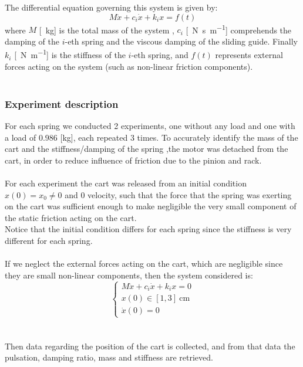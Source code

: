 The differential equation governing this system is given by:
$$M\ddot{x}+c_i\dot{x}+k_i x = f(t)$$
where $M$ [\SI{}{\kilo \gram}] is the total mass of the system  , $c_i$ [\SI{}{\newton \second \per \meter }] comprehends the damping of the $i$-eth spring and the viscous damping of the sliding guide. Finally $k_i$ [\SI{}{\newton \per \meter}] is the stiffness of the $i$-eth spring, and $f(t)$ represents external forces acting on the system (such as non-linear friction components). 
\\ \\
\subsubsection{Experiment description}
For each spring we conducted 2 experiments, one without any load and one with a load of $0.986$ [\si{\kg}], each repeated 3 times. To accurately identify the mass of the cart and the stiffness/damping of the spring ,the motor was detached from the cart, in order to reduce influence of friction due to the pinion and rack. \\\\
For each experiment the  cart was released from an initial condition $x(0) =x_0 \neq 0$ and $0$ velocity,  such that the force that the spring was exerting on the cart was sufficient enough to  make negligible the very small component of the static friction acting on the cart. \\ Notice that the initial condition differs for each spring since the stiffness is very different for each spring. \\\\
If we neglect the external forces acting on the cart, which are negligible since they are small non-linear components, then the system considered is:
\begin{equation} \label{eq:cart_detached_motor}
\begin{cases}
M\ddot{x}+c_i\dot{x}+k_i x = 0 \\
x(0) \in [1,3] \SI{}{\cm} \\
\dot{x}(0)=0
\end{cases}
\end{equation} \\ \\
Then data regarding the position of the cart is collected, and from that data the pulsation, damping ratio, mass and stiffness are retrieved.


